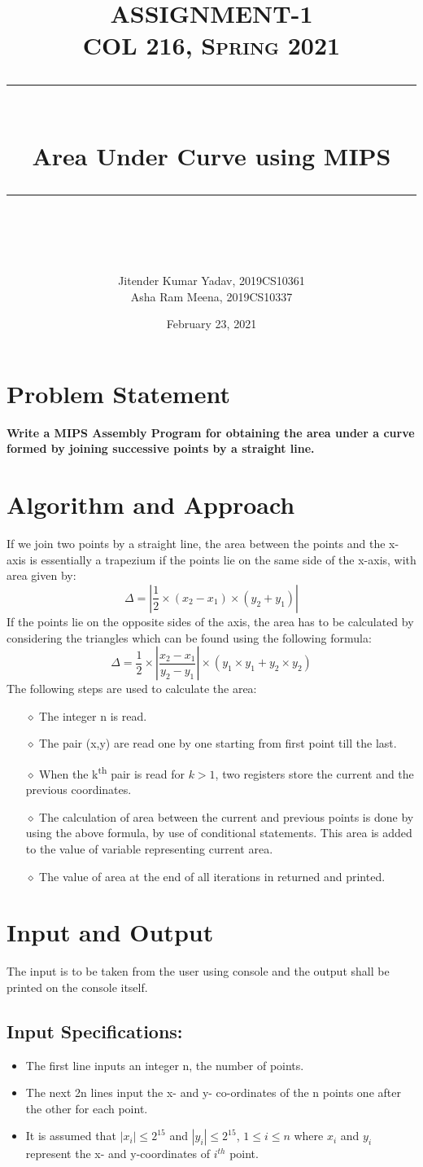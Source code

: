 \documentclass{article} %
\title{
\normalfont \large
\textsc{ASSIGNMENT-1
\vspace{10pt}
\\COL 216, Spring 2021} \\
[10pt] 
\rule{\linewidth}{0.5pt} \\[6pt] 
\Large Area Under Curve using MIPS \\
\rule{\linewidth}{2pt}  \\[10pt]
}
\author{Jitender Kumar Yadav, 2019CS10361
\\Asha Ram Meena, 2019CS10337}
\date{\normalsize February 23, 2021}
\begin{document}
\maketitle
\section{Problem Statement}
\textbf{Write a MIPS Assembly Program for obtaining the area under a curve formed by joining successive points by a straight line.}

\section{Algorithm and Approach}
If we join two points by a straight line, the area between the points and the x-axis is essentially a trapezium if the points lie on the same side of the x-axis, with area given by:
\[\Delta = \left | \frac{1}{2} \times (x_2 - x_1) \times (y_2 + y_1)\right | \]
If the points lie on the opposite sides of the axis, the area has to be calculated by considering the triangles which can be found using the following formula:
\[\Delta = \frac{1}{2} \times \left | \frac{x_2 - x_1}{y_2 - y_1} \right | \times (y_1 \times y_1 + y_2 \times y_2)\]
The following steps are used to calculate the area:
\begin{itemize}
    \item[$\diamond$] The integer n is read.
    \item[$\diamond$] The pair (x,y) are read one by one starting from first point till the last.
    \item[$\diamond$] When the k\textsuperscript{th} pair is read for $k > 1$, two registers store the current and the previous coordinates.
    \item[$\diamond$] The calculation of area between the current and previous points is done by using the above formula, by use of conditional statements. This area is added to the value of variable representing current area.
    \item[$\diamond$] The value of area at the end of all iterations in returned and printed.
\end{itemize}

\section{Input and Output}
The input is to be taken from the user using console and the output shall be printed on the console itself.
\subsection{Input Specifications:}
\begin{itemize}
    \item The first line inputs an integer n, the number of points.
    \item The next 2n lines input the x- and y- co-ordinates of the n points one after the other for each point.
    \item It is assumed that $\left|x_i\right| \leq 2^{15}$ and $\left|y_i\right| \leq 2^{15}$, $1 \leq i \leq n$ where $x_i$ and $y_i$ represent the x- and y-coordinates of $i^{th}$ point.
\end{itemize}
\end{document}
